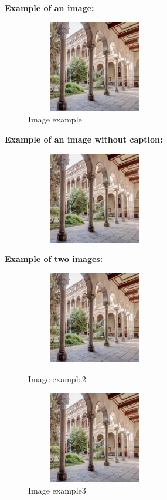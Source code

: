 \textbf{Example of an image:}
\begin{figure}[H]
    \centering
    \includegraphics[width=6cm, height=4cm]{images/edifici-historic-universitat-de-barcelona.jpg}
    \caption{Image example}
    \label{fig:image_example}
\end{figure}

\textbf{Example of an image without caption:}
\begin{figure}[H]
    \centering
    \includegraphics[width=6cm, height=4cm]{images/edifici-historic-universitat-de-barcelona.jpg}
    \label{fig:image_example_no_caption}
\end{figure}


\textbf{Example of two images:}
\begin{figure}[H]
    \centering
    \begin{minipage}[t]{0.48\textwidth}
        \centering
        \includegraphics[width=6cm, height=4cm]{images/edifici-historic-universitat-de-barcelona.jpg}
        \caption{Image example2}
        \label{fig:image_example2}
    \end{minipage}
    \begin{minipage}[t]{0.48\textwidth}
        \centering
        \includegraphics[width=6cm, height=4cm]{images/edifici-historic-universitat-de-barcelona.jpg}
        \caption{Image example3}
        \label{fig:image_example3}
    \end{minipage}
\end{figure}



